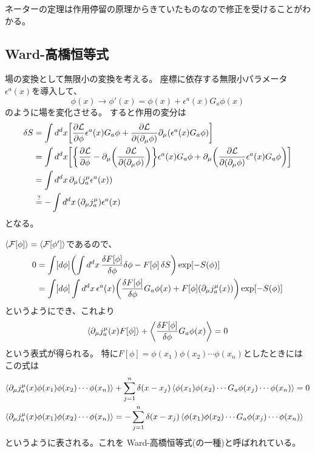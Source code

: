 \documentclass[../../master.tex]{subfiles}
\begin{document}
ネーターの定理は作用停留の原理からきていたものなので修正を受けることがわかる。

\subsection*{Ward-高橋恒等式}
場の変換として無限小の変換を考える。
座標に依存する無限小パラメータ\(\epsilon^a(x)\)を導入して、
\begin{equation}
    \phi(x) \rightarrow \phi'(x) = \phi(x) +\epsilon^a(x)G_a\phi(x)
\end{equation}
のように場を変化させる。
すると作用の変分は
\begin{align}
    \delta S
    &= \int d^dx\qty[
        \pdv{\mathcal{L}}{\phi}\epsilon^a(x)G_a\phi
        +\pdv{\mathcal{L}}{(\partial_\mu\phi)}\partial_\mu(\epsilon^a(x)G_a\phi)
    ]\notag\\
    &= \int d^dx\qty[
        \qty{\pdv{\mathcal{L}}{\phi}-\partial_\mu\qty(\pdv{\mathcal{L}}{(\partial_\mu\phi)})}\epsilon^a(x)G_a\phi
        +\partial_\mu\qty(\pdv{\mathcal{L}}{(\partial_\mu \phi)}\epsilon^a(x) G_a\phi)
    ]\notag\\
    &= \int d^dx\,
        \partial_\mu\qty(j_a^\mu \epsilon^a(x))\notag\\
    &\overset{?}{=} -\int d^dx\,(\partial_\mu j_a^\mu)\epsilon^a(x)
\end{align}
となる。

\(\ev{\mathcal{F} [\phi]}=\ev{\mathcal{F} [\phi']}\)であるので、
\begin{align*}
    0
    &= \int[d\phi]\qty(\int d^dx\, \fdv{F[\phi]}{\phi}\delta\phi -F[\phi]\var{S})\exp[-S(\phi)] \notag\\
    &= \int[d\phi]\int d^dx\,\epsilon^a(x)\qty(\fdv{F[\phi]}{\phi}G_a\phi(x) +F[\phi](\partial_\mu j_a^\mu(x)))\exp[-S(\phi)] \notag\\
\end{align*}
というようにでき、これより
\begin{equation*}
    \ev{\partial_\mu j_a^\mu(x) F[\phi]} + \ev{\fdv{F[\phi]}{\phi}G_a\phi(x)} =0
\end{equation*}
という表式が得られる。
特に\(F[\phi]=\phi(x_1)\phi(x_2)\cdots\phi(x_n)\)としたときにはこの式は
\begin{align}
    \ev{\partial_\mu j_a^\mu(x) \phi(x_1)\phi(x_2)\cdots\phi(x_n)}
    &+\sum_{j=1}^n \delta(x-x_j)\ev{\phi(x_1)\phi(x_2)\cdots G_a\phi(x_j)\cdots\phi(x_n)} = 0\\
    \ev{\partial_\mu j_a^\mu(x) \phi(x_1)\phi(x_2)\cdots\phi(x_n)}
    &=-\sum_{j=1}^n \delta(x-x_j)\ev{\phi(x_1)\phi(x_2)\cdots G_a\phi(x_j)\cdots\phi(x_n)}
\end{align}
というように表される。これを Ward-高橋恒等式(の一種)と呼ばれれている。
\end{document}
